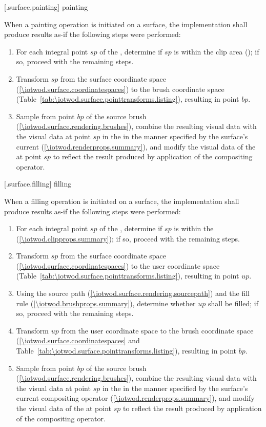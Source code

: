  [\iotwod.surface.painting] { painting}

\pnum
When a painting operation is initiated on a surface, the implementation shall produce results as-if the following steps were performed:

\begin{enumerate}
\item For each integral point $sp$ of the \underlyingsurface, determine if $sp$ is within the clip area (); if so, proceed with the remaining steps.
\item Transform $sp$ from the surface coordinate space (\ref{\iotwod.surface.coordinatespaces}) to the brush coordinate space (Table~\ref{tab:\iotwod.surface.pointtransforms.listing}), resulting in point $bp$.
\item Sample from point $bp$ of the source brush (\ref{\iotwod.surface.rendering.brushes}), combine the resulting visual data with the visual data at point $sp$ in the \underlyingsurface in the manner specified by the surface's current  (\ref{\iotwod.renderprops.summary}), and modify the visual data of the \underlyingsurface at point $sp$ to reflect the result produced by application of the compositing operator.
\end{enumerate}

 [\iotwod.surface.filling] { filling}

\pnum
When a filling operation is initiated on a surface, the implementation shall produce results as-if the following steps were performed:

\begin{enumerate}
\item For each integral point $sp$ of the \underlyingsurface, determine if $sp$ is within the  (\ref{\iotwod.clipprops.summary}); if so, proceed with the remaining steps.
\item Transform $sp$ from the surface coordinate space (\ref{\iotwod.surface.coordinatespaces}) to the user coordinate space (Table~\ref{tab:\iotwod.surface.pointtransforms.listing}), resulting in point $up$.
\item Using the source path (\ref{\iotwod.surface.rendering.sourcepath}) and the fill rule (\ref{\iotwod.brushprops.summary}), determine whether $up$ shall be filled; if so, proceed with the remaining steps.
\item Transform $up$ from the user coordinate space to the brush coordinate space (\ref{\iotwod.surface.coordinatespaces} and Table~\ref{tab:\iotwod.surface.pointtransforms.listing}), resulting in point $bp$.
\item Sample from point $bp$ of the source brush (\ref{\iotwod.surface.rendering.brushes}), combine the resulting visual data with the visual data at point $sp$ in the \underlyingsurface in the manner specified by the surface's current compositing operator (\ref{\iotwod.renderprops.summary}), and modify the visual data of the \underlyingsurface at point $sp$ to reflect the result produced by application of the compositing operator.
\end{enumerate}

